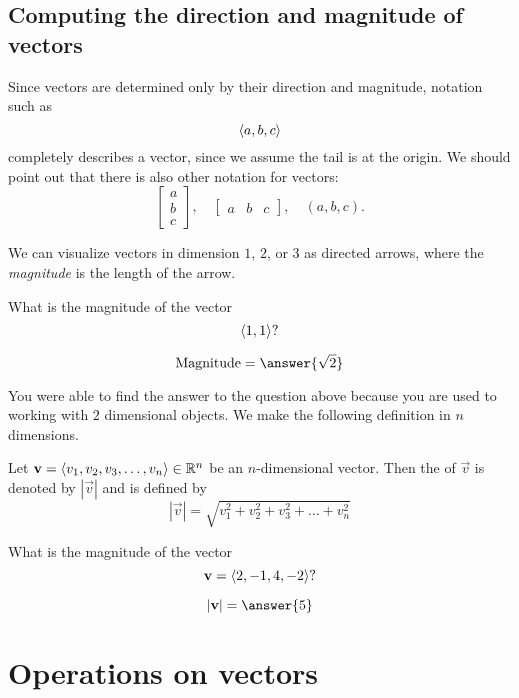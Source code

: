 \documentclass{ximera}
\begin{document}
\subsection{Computing the direction and magnitude of vectors}


Since vectors are determined only by their direction and magnitude,
notation such as
\[
\left\langle a,b,c\right\rangle
\]
completely describes a vector, since we assume the tail is at the
origin. We should point out that there is also other notation for
vectors:
\[
\begin{bmatrix}
  a\\
  b\\
  c
\end{bmatrix}, \quad
\begin{bmatrix}
  a & b & c
\end{bmatrix},
\quad
(a,b,c).
\]

We can visualize vectors in dimension $1$, $2$, or $3$ as directed
arrows, where the \textit{magnitude} is the length of the arrow.

\begin{question}
  What is the magnitude of the vector 
  \[
  \left\langle 1,1\right\rangle?
  \]
  \begin{prompt}
    \[
    \text{Magnitude}  = \answer{\sqrt{2}}
    \]
  \end{prompt}
\end{question}

You were able to find the answer to the question above because you are
used to working with $2$ dimensional objects.  We make the following
definition in $n$ dimensions.

\begin{definition}
	Let $\mathbf{v} = \langle v_1, v_2, v_3, \dots, v_n \rangle \in
        \mathbb R^n$ be an $n$-dimensional vector.  Then the 
        of $\vec{v}$ is denoted by $|\vec{v}|$ and is defined by
	\[
	|\vec{v}| = \sqrt{v_1^2+v_2^2+v_3^2+\dots+v_n^2}
	\]
\end{definition}

\begin{question}
  What is the magnitude of the vector
  \[
  \mathbf{v}=\left\langle 2,-1,4,-2\right\rangle?
  \]
  \begin{prompt}
    \[
    |\vec{v}|=\answer{5}
    \]
  \end{prompt}
\end{question}




\section{Operations on vectors}
\end{document}
